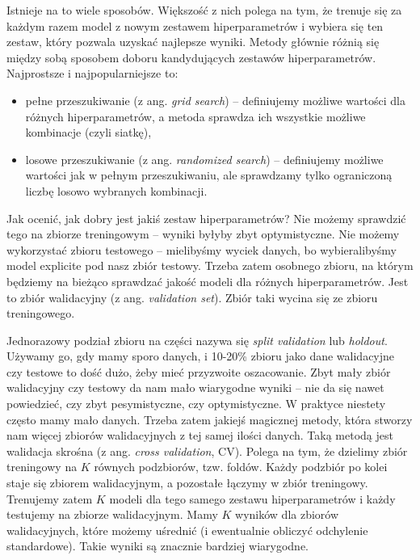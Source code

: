 \documentclass{myclass}
\numberwithin{equation}{subsection}
\begin{document}
Istnieje na to wiele sposobów. Większość z nich polega na tym, że trenuje się za każdym razem model
z nowym zestawem hiperparametrów i wybiera się ten zestaw, który pozwala uzyskać najlepsze wyniki.
Metody głównie różnią się między sobą sposobem doboru kandydujących zestawów hiperparametrów.
Najprostsze i najpopularniejsze to:
\begin{itemize}
\item pełne przeszukiwanie (z ang. \textit{grid search}) -- definiujemy możliwe wartości dla różnych
hiperparametrów, a metoda sprawdza ich wszystkie możliwe kombinacje (czyli siatkę),

\item losowe przeszukiwanie (z ang. \textit{randomized search}) -- definiujemy możliwe wartości jak
w pełnym przeszukiwaniu, ale sprawdzamy tylko ograniczoną liczbę losowo wybranych kombinacji.
\end{itemize}

Jak ocenić, jak dobry jest jakiś zestaw hiperparametrów? Nie możemy sprawdzić tego na zbiorze
treningowym -- wyniki byłyby zbyt optymistyczne. Nie możemy wykorzystać zbioru testowego --
mielibyśmy wyciek danych, bo wybieralibyśmy model explicite pod nasz zbiór testowy. Trzeba zatem
osobnego zbioru, na którym będziemy na bieżąco sprawdzać jakość modeli dla różnych hiperparametrów.
Jest to zbiór walidacyjny (z ang. \textit{validation set}). Zbiór taki wycina się ze zbioru
treningowego.

Jednorazowy podział zbioru na części nazywa się \textit{split validation} lub \textit{holdout}.
Używamy go, gdy mamy sporo danych, i 10-20\% zbioru jako dane walidacyjne czy testowe to dość dużo,
żeby mieć przyzwoite oszacowanie. Zbyt mały zbiór walidacyjny czy testowy da nam mało wiarygodne
wyniki -- nie da się nawet powiedzieć, czy zbyt pesymistyczne, czy optymistyczne. W praktyce
niestety często mamy mało danych. Trzeba zatem jakiejś magicznej metody, która stworzy nam więcej
zbiorów walidacyjnych z tej samej ilości danych. Taką metodą jest walidacja skrośna (z ang.
\textit{cross validation}, CV). Polega na tym, że dzielimy zbiór treningowy na \(K\) równych
podzbiorów, tzw. foldów. Każdy podzbiór po kolei staje się zbiorem walidacyjnym, a pozostałe łączymy
w zbiór treningowy. Trenujemy zatem \(K\) modeli dla tego samego zestawu hiperparametrów i każdy
testujemy na zbiorze walidacyjnym. Mamy \(K\) wyników dla zbiorów walidacyjnych, które możemy
uśrednić (i ewentualnie obliczyć odchylenie standardowe). Takie wyniki są znacznie bardziej
wiarygodne.
\end{document}
